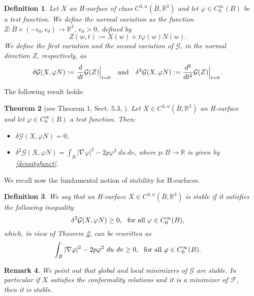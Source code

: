\documentclass[a4paper,reqno,10pt,oneside]{amsart}
\numberwithin{equation}{section}
\newtheorem{theorem}{Theorem}[section]
\newtheorem{remark}[theorem]{Remark}
\newtheorem{definition}[theorem]{Definition}
\begin{document}
\begin{definition}
Let $X$ an H-surface of class $C^{3,\alpha}(\overline{B},{\mathbb R}^3)$ and let $\varphi \in C_0^\infty(B)$ be a test function.
We define the normal variation as the function $Z: \overline{B} \times (-{\epsilon}_0,{\epsilon}_0) \to {\mathbb R}^3$, ${\epsilon}_0>0$, defined by 
$$ Z(w,t):=X(w) + t\varphi(w) N(w).$$
We define the first variation and the second variation of $\mathcal{G}$, in the normal direction $Z$, respectively, as
$$  \delta \mathcal{G}(X,\varphi N):=\frac{d}{dt}\mathcal{G}(Z) \Big{|}_{t=0}\quad\text{and}\quad
\delta^2 \mathcal{G}(X,\varphi N):=\frac{d^2}{dt^2}\mathcal{G}(Z) \Big{|}_{t=0}~\!.
$$
\end{definition}
The following result holds:
\begin{theorem}[see Theorem 1, Sect. 5.3, \cite{MinSurf}] \label{teonormvar}
Let $X \in C^{3,\alpha}(\overline{B},{\mathbb R}^3)$ an H-surface and let $\varphi \in C_0^\infty(B)$ a test function. Then: 
\begin{itemize}
\item[(i)] $\delta \mathcal{G}(X,\varphi N)=0$,
\item[(ii)] $\displaystyle \delta^2 \mathcal{G}(X,\varphi N)= \int_B |\nabla \varphi|^2 - 2 p \varphi^2 \ du \ dv$, where $p:B \rightarrow {\mathbb R}$ is given by \eqref{densityfunct}.
\end{itemize}
\end{theorem}

We recall now the fundamental notion of stability for H-surfaces.
\begin{definition}\label{defstablehsurf}
We say that an H-surface $X \in C^{3,\alpha}(\overline{B},{\mathbb R}^3)$ is stable if it satisfies the following inequality
$$ \delta^2 \mathcal{G}(X,\varphi N) \geq 0, \ \ \hbox{for all} \ \varphi \in C_0^{\infty}(B),$$
which, in view of Theorem \ref{teonormvar}, can be rewritten as
$$\displaystyle \int_B |\nabla \varphi|^2 - 2 p \varphi^2 \ du \ dv \geq 0, \ \ \hbox{for all} \ \varphi \in C_0^{\infty}(B).$$
\end{definition}

\begin{remark}\label{stabilitymin}
We point out that global and local minimizers of $\mathcal{G}$ are stable. In particular if $X$ satisfies the conformality relations and it is a minimizer of $\mathcal{F}$, then it is stable.
\end{remark}
\end{document}
